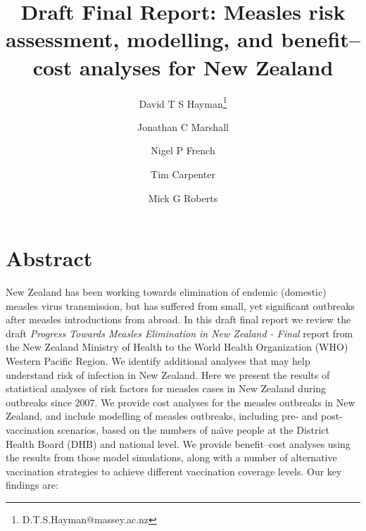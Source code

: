 \documentclass{article}
\begin{document}


\title{Draft Final Report: Measles risk assessment, modelling, and benefit--cost analyses for New Zealand}
\author[1]{David T S Hayman\thanks{D.T.S.Hayman@massey.ac.nz}}
\author[1] {Jonathan C Marshall}
\author[1] {Nigel P French}
\author[2] {Tim Carpenter}
\author[3] {Mick G Roberts}
\date{}
\maketitle

\section{Abstract}

New Zealand has been working towards elimination of endemic (domestic) measles virus transmission, but has suffered from small, yet significant outbreaks after measles introductions from abroad. In this draft final report we review the draft \emph {Progress Towards Measles Elimination in New Zealand - Final} report from the New Zealand Ministry of Health to the World Health Organization (WHO) Western Pacific Region. We identify additional analyses that may help understand risk of infection in New Zealand. Here we present the results of statistical analyses of risk factors for measles cases in New Zealand during outbreaks since 2007. We provide cost analyses for the measles outbreaks in New Zealand, and include modelling of measles outbreaks, including pre- and post-vaccination scenarios, based on the numbers of na\"{\i}ve people at the District Health Board (DHB) and national level. We provide benefit--cost analyses using the results from those model simulations, along with a number of alternative vaccination strategies to achieve different vaccination coverage levels. Our key findings are:
\end{document}
